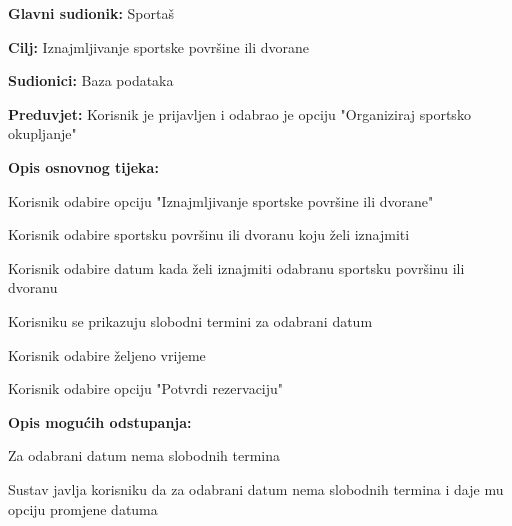 					\noindent {}
					\begin{packed_item}
						
						\item \textbf{Glavni sudionik: }Sportaš
						\item  \textbf{Cilj:} Iznajmljivanje sportske površine ili dvorane
						\item  \textbf{Sudionici:} Baza podataka
						\item  \textbf{Preduvjet:} Korisnik je prijavljen i odabrao je opciju "Organiziraj sportsko okupljanje"
						\item  \textbf{Opis osnovnog tijeka:}
						
						\item[] \begin{packed_enum}
							
							\item Korisnik odabire opciju "Iznajmljivanje sportske površine ili dvorane"
							\item Korisnik odabire sportsku površinu ili dvoranu koju želi iznajmiti
							\item Korisnik odabire datum kada želi iznajmiti odabranu sportsku površinu ili dvoranu
							\item Korisniku se prikazuju slobodni termini za odabrani datum
							\item Korisnik odabire željeno vrijeme
							\item Korisnik odabire opciju "Potvrdi rezervaciju"
						\end{packed_enum}
						
						\item  \textbf{Opis mogućih odstupanja:}
						
						\item[] \begin{packed_item}
							
							\item[3.a] Za odabrani datum nema slobodnih termina 
							\item[] \begin{packed_enum}
								
								\item Sustav javlja korisniku da za odabrani datum nema slobodnih termina i daje mu opciju promjene datuma
								
							\end{packed_enum}
							
						\end{packed_item}
						
					\end{packed_item}
					

